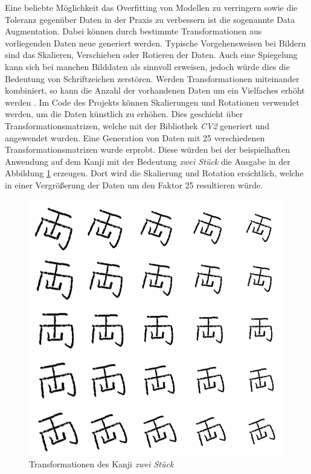 \documentclass[twoside,a4paper]{IEEEtran}
\begin{document}
Eine beliebte Möglichkeit das Overfitting von Modellen zu verringern sowie die Toleranz gegenüber Daten in der Praxis zu verbessern ist die sogenannte Data Augmentation. Dabei können durch bestimmte Transformationen aus vorliegenden Daten neue generiert werden. Typische Vorgehensweisen bei Bildern sind das Skalieren, Verschieben oder Rotieren der Daten. Auch eine Spiegelung kann sich bei manchen Bilddaten als sinnvoll erweisen, jedoch würde dies die Bedeutung von Schriftzeichen zerstören. Werden Transformationen miteinander kombiniert, so kann die Anzahl der vorhandenen Daten um ein Vielfaches erhöht werden \cite[S.311]{MACHINE_LEARNING}. Im Code des Projekts können Skalierungen und Rotationen verwendet werden, um die Daten künstlich zu erhöhen. Dies geschieht über Transformationsmatrizen, welche mit der Bibliothek \emph{CV2} generiert und angewendet wurden. Eine Generation von Daten mit 25 verschiedenen Transformationsmatrizen wurde erprobt. Diese würden bei der beispielhaften Anwendung auf dem Kanji mit der Bedeutung \textit{zwei Stück} die Ausgabe in der Abbildung \ref{rot} erzeugen. Dort wird die Skalierung und Rotation ersichtlich, welche in einer Vergrößerung der Daten um den Faktor 25 resultieren würde.
\begin{figure}[!htb]
	\includegraphics[width=\columnwidth]{rot_scale}
	\caption{Transformationen des Kanji \textit{zwei Stück}}
	\label{rot}
\end{figure}
\end{document}
